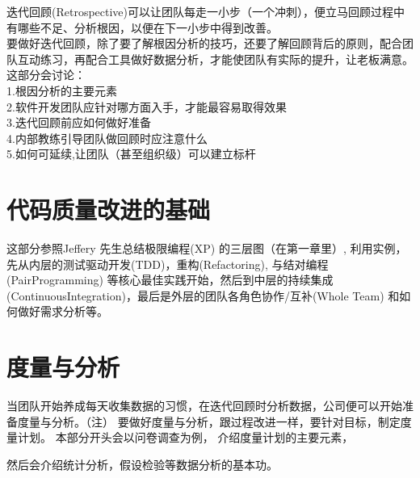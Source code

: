 \documentclass{book}        %
\begin{document}
迭代回顾(Retrospective)可以让团队每走一小步（一个冲刺），便立马回顾过程中有哪些不足、分析根因，以便在下一小步中得到改善。\\

要做好迭代回顾，除了要了解根因分析的技巧，还要了解回顾背后的原则，配合团队互动练习，再配合工具做好数据分析，才能使团队有实际的提升，让老板满意。\\

这部分会讨论： \\

1.根因分析的主要元素\\
2.软件开发团队应针对哪方面入手，才能最容易取得效果\\
3.迭代回顾前应如何做好准备\\
4.内部教练引导团队做回顾时应注意什么\\
5.如何可延续,让团队（甚至组织级）可以建立标杆\\





\part{代码质量改进的基础}这部分参照Jeffery 先生总结极限编程(XP) 的三层图（在第一章里）, 利用实例，先从内层的测试驱动开发(TDD)，重构(Refactoring), 与结对编程(PairProgramming) 等核心最佳实践开始，然后到中层的持续集成(ContinuousIntegration)，最后是外层的团队各角色协作/互补(Whole Team) 和如何做好需求分析等。















\part{度量与分析}当团队开始养成每天收集数据的习惯，在迭代回顾时分析数据，公司便可以开始准备度量与分析。（注） 要做好度量与分析，跟过程改进一样，要针对目标，制定度量计划。 本部分开头会以问卷调查为例， 介绍度量计划的主要元素，

然后会介绍统计分析，假设检验等数据分析的基本功。\\
\end{document}
